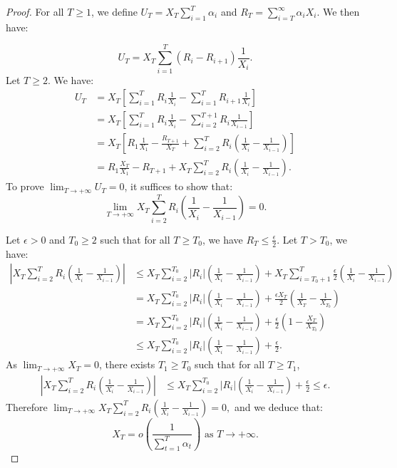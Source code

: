 \documentclass[10pt,a4paper]{amsart}
\begin{document}
\begin{proof}
    For all $T \ge 1$, we define $U_T=X_T \sum_{i=1}^T \alpha_i$ and $R_T=\sum_{i=T}^{\infty} \alpha_i X_i.$ We then have:
 
 $$
    U_T=X_T\sum_{i=1}^T (R_{i}-R_{i+1})\frac{1}{X_i} .
  $$
 Let $T \ge 2.$ We have:
 \begin{align*}
      U_T&=X_T \left[ \sum_{i=1}^T R_i\frac{1}{X_i}-\sum_{i=1}^T R_{i+1}\frac{1}{X_i}  \right]\\
      &= X_T \left[ \sum_{i=1}^T R_i\frac{1}{X_i}-\sum_{i=2}^{T+1} R_i\frac{1}{X_{i-1}}   \right]\\
      &= X_T \left[ R_1 \frac{1}{X_1}-\frac{R_{T+1}}{X_{T}} +\sum_{i=2}^T R_i (\frac{1}{X_i}-\frac{1}{X_{i-1}})  \right]\\
      &=R_1 \frac{X_T}{X_1}-R_{T+1}+X_T \sum_{i=2}^T R_i (\frac{1}{X_i}-\frac{1}{X_{i-1}}).
 \end{align*}
 To prove \( \lim_{T \to +\infty} U_T = 0 \), it suffices to show that:
\[
\lim_{T \to +\infty} X_T \sum_{i=2}^T R_i (\frac{1}{X_i}-\frac{1}{X_{i-1}}) = 0.
\]

Let $\epsilon>0$ and $T_0 \ge 2$ such that for all $T \ge T_0$, we have $ R_T  \le \frac{\epsilon}{2}$. Let $T > T_0$, we have:
 \begin{align*}
 \left| X_T \sum_{i=2}^T R_i (\frac{1}{X_i}-\frac{1}{X_{i-1}})    \right| &\le X_T \sum_{i=2}^{T_0} |R_i|(\frac{1}{X_i}-\frac{1}{X_{i-1}}) +X_T\sum_{i=T_0+1}^{T} \frac{\epsilon}{2} (\frac{1}{X_i}-\frac{1}{X_{i-1}})
 \\
 &= X_T \sum_{i=2}^{T_0} |R_i|(\frac{1}{X_i}-\frac{1}{X_{i-1}}) + \frac{\epsilon X_T}{2}  (\frac{1}{X_T}-\frac{1}{X_{T_0}})
  \\
 &= X_T \sum_{i=2}^{T_0} |R_i|(\frac{1}{X_i}-\frac{1}{X_{i-1}}) + \frac{\epsilon}{2} (1-\frac{X_T}{X_{T_0}})
 \\&\le X_T \sum_{i=2}^{T_0} |R_i|(\frac{1}{X_i}-\frac{1}{X_{i-1}}) + \frac{\epsilon}{2}.
 \end{align*}
As $\lim_{T \to +\infty} X_T=0$, there exists $T_1 \ge T_0$ such that for all $T \ge T_1$,
 \begin{align*}
 \left| X_T \sum_{i=2}^T R_i (\frac{1}{X_i}-\frac{1}{X_{i-1}})    \right| 
 &\le X_T \sum_{i=2}^{T_0} |R_i|(\frac{1}{X_i}-\frac{1}{X_{i-1}}) + \frac{\epsilon }{2}\le \epsilon.
 \end{align*}
 Therefore $\lim_{T \to +\infty} X_T \sum_{i=2}^T R_i (\frac{1}{X_i}-\frac{1}{X_{i-1}}) = 0,$ and we deduce that: \[
X_T = o\left( \frac{1}{\sum_{t=1}^T \alpha_t} \right) \text{ as } T \to +\infty.
\]
\end{proof}
\end{document}
